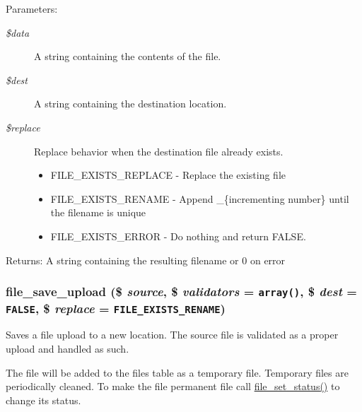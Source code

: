 \begin{Desc}
\item[Parameters:]
\begin{description}
\item[{\em \$data}]A string containing the contents of the file. \item[{\em \$dest}]A string containing the destination location. \item[{\em \$replace}]Replace behavior when the destination file already exists.\begin{itemize}
\item FILE\_\-EXISTS\_\-REPLACE - Replace the existing file\item FILE\_\-EXISTS\_\-RENAME - Append \_\-\{incrementing number\} until the filename is unique\item FILE\_\-EXISTS\_\-ERROR - Do nothing and return FALSE.\end{itemize}
\end{description}
\end{Desc}
\begin{Desc}
\item[Returns:]A string containing the resulting filename or 0 on error \end{Desc}
\hypertarget{group__file_gfb10e016dd068cbc5915619f7ca9bf2c}{
\subsubsection[{file\_\-save\_\-upload}]{\setlength{\rightskip}{0pt plus 5cm}file\_\-save\_\-upload (\$ {\em source}, \/  \$ {\em validators} = {\tt array()}, \/  \$ {\em dest} = {\tt FALSE}, \/  \$ {\em replace} = {\tt FILE\_\-EXISTS\_\-RENAME})}}
\label{group__file_gfb10e016dd068cbc5915619f7ca9bf2c}


Saves a file upload to a new location. The source file is validated as a proper upload and handled as such.

The file will be added to the files table as a temporary file. Temporary files are periodically cleaned. To make the file permanent file call \hyperlink{group__file_g68a0e6728e47cf2f9d543a0002ff3f49}{file\_\-set\_\-status()} to change its status.

